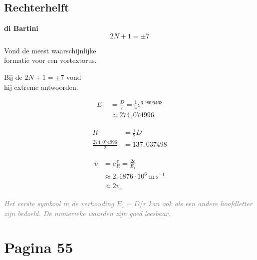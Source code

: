 \documentclass[11pt,a4paper]{article}
\newcommand{\uncertain}[1]{\textit{\textcolor{gray}{#1}}}
\begin{document}
\hfill
\begin{minipage}[t]{0.47\textwidth}
\subsection*{Rechterhelft}

{\color{green!50!black}\textbf{di Bartini}}
\qquad
\[
2N+1=\pm 7
\]

{\color{green!50!black}
Vond de meest waarschijnlijke\\
formatie voor een vortextorus.

Bij de $2N+1=\pm7$ vond\\
hij extreme antwoorden.
}

\begin{align*}
E_1
&=
\frac{D}{r}
=
\frac14 e^{6{,}9996468}
\\
&\approx 274{,}074996
\end{align*}

\begin{align*}
R &= \frac12 D
\\
\frac{274{,}074996}{2}
&=
137{,}037498
\end{align*}

\begin{align*}
v
&=
c\frac{r}{R}
=
\frac{2c}{E_1}
\\
&\approx
2{,}1876\cdot10^6\ \mathrm{m\,s^{-1}}
\\
&\approx 2v_e
\end{align*}

\uncertain{Het eerste symbool in de verhouding $E_1=D/r$ kan ook als een andere hoofdletter zijn bedoeld. De numerieke waarden zijn goed leesbaar.}
\end{minipage}

\clearpage
\section*{Pagina 55}
\end{document}

